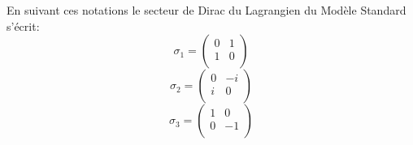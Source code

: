 En suivant ces notations le secteur de Dirac du Lagrangien du Modèle Standard s'écrit:
\marginpar
{
\begin{equation*}
\sigma_{1}=\begin{pmatrix} 
0&1\\
1&0\\
\end{pmatrix}
\end{equation*}
\vspace{0.2cm}
\begin{equation*}
\sigma_{2}=\begin{pmatrix} 
0&-i\\
i&0\\
\end{pmatrix}
\end{equation*}
\vspace{0.2cm}
\begin{equation*}
\sigma_{3}=\begin{pmatrix} 
1&0\\
0&-1\\
\end{pmatrix}
\end{equation*}
\label{Pauli}
}
\marginpar
